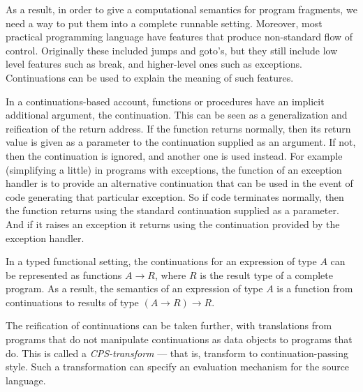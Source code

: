 \documentclass{sn-jnl}
\begin{document}
As a result, in order to give a computational semantics for program fragments, we need a way to put them into a complete runnable setting. 
Moreover, most practical programming language have features that produce non-standard flow of control. Originally these included jumps and goto's, but they still include low level features such as break, and higher-level ones such as exceptions. Continuations can be used to explain the meaning of such features. 

In a continuations-based account, functions or procedures have an implicit additional argument, the continuation. This can be seen as a generalization and reification of the return address. If the function returns normally, then its return value is given as a parameter to the continuation supplied as an argument. If not, then the continuation is ignored, and another one is used instead. For example (simplifying a little) in programs with exceptions, the function of an exception handler is to provide an alternative continuation that can be used in the event of code generating that particular exception. So if code terminates normally, then the function returns using the standard continuation supplied as a parameter. And if it raises an exception it returns using the continuation provided by the exception handler. 

In a typed functional setting, the continuations for an expression of type $A$ can be represented as functions $A \to R$, where $R$ is the result type of a complete program. As a result, the semantics of an expression of type $A$ is a function from continuations to results of type $(A \to R) \to R$. 

The reification of continuations can be taken further, with translations from programs that do not manipulate continuations as data objects to programs that do. This is called a \emph{CPS-transform} --- that is, transform to continuation-passing style. Such a transformation can specify an evaluation mechanism for the source language. 
\end{document}
